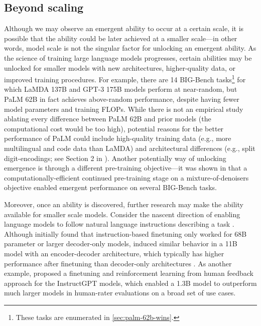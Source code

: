 \subsection{Beyond scaling}\label{subsec:beyond-scaling}
Although we may observe an emergent ability to occur at a certain scale, it is possible that the ability could be later achieved at a smaller scale---in other words, model scale is not the singular factor for unlocking an emergent ability. As the science of training large language models progresses, certain abilities may be unlocked for smaller models with new architectures, higher-quality data, or improved training procedures. For example, there are 14 BIG-Bench tasks\footnote{These tasks are enumerated in \ref{sec:palm-62b-wins}.} for which LaMDA 137B and GPT-3 175B models perform at near-random, but PaLM 62B in fact achieves above-random performance, despite having fewer model parameters and training FLOPs. While there is not an empirical study ablating every difference between PaLM 62B and prior models (the computational cost would be too high), potential reasons for the better performance of PaLM could include high-quality training data (e.g., more multilingual and code data than LaMDA) and architectural differences (e.g., split digit-encodings; see Section 2 in \citet{chowdhery2022palm}).
Another potentially way of unlocking emergence is through a different pre-training objective---it was shown in \citet{tay2022transcending} that a computationally-efficient continued pre-training stage on a mixture-of-denoisers objective \citep{tay2022unifying} enabled emergent performance on several BIG-Bench tasks.

Moreover, once an ability is discovered, further research may make the ability available for smaller scale models. Consider the nascent direction of enabling language models to follow natural language instructions describing a task \citep[][\textit{inter alia}]{wei2021finetuned,sanh2022multitask,ouyang2022training}. Although \citet{wei2021finetuned} initially found that instruction-based finetuning only worked for 68B parameter or larger decoder-only models, \citet{sanh2022multitask} induced similar behavior in a 11B model with an encoder-decoder architecture, which typically has higher performance after finetuning than decoder-only architectures \citep{wang2022language}. As another example, \citet{ouyang2022training} proposed a finetuning and reinforcement learning from human feedback approach for the InstructGPT models, which enabled a 1.3B model to outperform much larger models in human-rater evaluations on a broad set of use cases.

